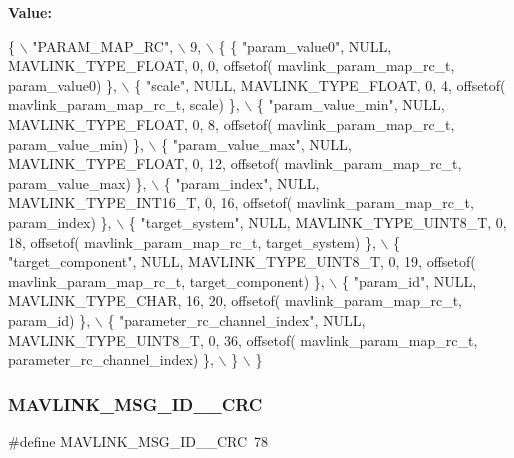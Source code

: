 {\bfseries Value\+:}
\begin{DoxyCode}
\{ \(\backslash\)
    \textcolor{stringliteral}{"PARAM\_MAP\_RC"}, \(\backslash\)
    9, \(\backslash\)
    \{  \{ \textcolor{stringliteral}{"param\_value0"}, NULL, MAVLINK_TYPE_FLOAT, 0, 0, offsetof(
      mavlink_param_map_rc_t, param\_value0) \}, \(\backslash\)
         \{ \textcolor{stringliteral}{"scale"}, NULL, MAVLINK_TYPE_FLOAT, 0, 4, offsetof(
      mavlink_param_map_rc_t, scale) \}, \(\backslash\)
         \{ \textcolor{stringliteral}{"param\_value\_min"}, NULL, MAVLINK_TYPE_FLOAT, 0, 8, offsetof(
      mavlink_param_map_rc_t, param\_value\_min) \}, \(\backslash\)
         \{ \textcolor{stringliteral}{"param\_value\_max"}, NULL, MAVLINK_TYPE_FLOAT, 0, 12, offsetof(
      mavlink_param_map_rc_t, param\_value\_max) \}, \(\backslash\)
         \{ \textcolor{stringliteral}{"param\_index"}, NULL, MAVLINK_TYPE_INT16_T, 0, 16, offsetof(
      mavlink_param_map_rc_t, param_index) \}, \(\backslash\)
         \{ \textcolor{stringliteral}{"target\_system"}, NULL, MAVLINK_TYPE_UINT8_T, 0, 18, offsetof(
      mavlink_param_map_rc_t, target\_system) \}, \(\backslash\)
         \{ \textcolor{stringliteral}{"target\_component"}, NULL, MAVLINK_TYPE_UINT8_T, 0, 19, offsetof(
      mavlink_param_map_rc_t, target\_component) \}, \(\backslash\)
         \{ \textcolor{stringliteral}{"param\_id"}, NULL, MAVLINK_TYPE_CHAR, 16, 20, offsetof(
      mavlink_param_map_rc_t, param\_id) \}, \(\backslash\)
         \{ \textcolor{stringliteral}{"parameter\_rc\_channel\_index"}, NULL, MAVLINK_TYPE_UINT8_T, 0, 36, offsetof(
      mavlink_param_map_rc_t, parameter\_rc\_channel\_index) \}, \(\backslash\)
         \} \(\backslash\)
\}
\end{DoxyCode}
\mbox{\label{mavlink__msg__param__map__rc_8h_a058acd193bdd3b91de32d854dc5cf735}} 
\subsubsection{M\+A\+V\+L\+I\+N\+K\+\_\+\+M\+S\+G\+\_\+\+I\+D\+\_\+\_\+\+C\+RC}
{\footnotesize\ttfamily \#define M\+A\+V\+L\+I\+N\+K\+\_\+\+M\+S\+G\+\_\+\+I\+D\+\_\+\_\+\+C\+RC~78}

